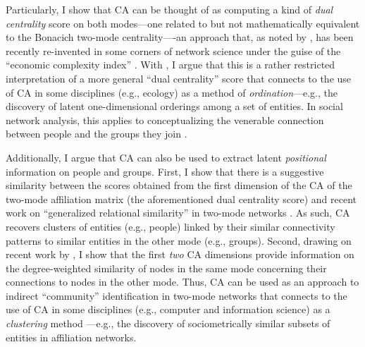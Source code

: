 \documentclass[a4paper,fleqn]{cas-sc}
\begin{document}
Particularly, I show that CA can be thought of as computing a kind of \textit{dual centrality} score on both modes---one related to but not mathematically equivalent to the Bonacich \citeyearpar{bonacich1991simultaneous} two-mode centrality----an approach that, as noted by \citet{van2021correspondence}, has been recently re-invented in some corners of network science under the guise of the ``economic complexity index'' \citep{hidalgo2009building, mealy2019interpreting}. With \citet{van2021correspondence}, I argue that this is a rather restricted interpretation of a more general ``dual centrality'' score that connects to the use of CA in some disciplines (e.g., ecology) as a method of \textit{ordination}---e.g., the discovery of latent one-dimensional orderings among a set of entities. In social network analysis, this applies to conceptualizing the venerable connection between people and the groups they join \citep{breiger1974duality}.

Additionally, I argue that CA can also be used to extract latent \textit{positional} information on people and groups. First, I show that there is a suggestive similarity between the scores obtained from the first dimension of the CA of the two-mode affiliation matrix (the aforementioned dual centrality score) and recent work on ``generalized relational similarity'' in two-mode networks \citep{kovacs2010generalized, lizardo2024two}. As such, CA recovers clusters of entities (e.g., people) linked by their similar connectivity patterns to similar entities in the other mode (e.g., groups). Second, drawing on recent work by \citet{van2021correspondence}, I show that the first \textit{two} CA dimensions provide information on the degree-weighted similarity of nodes in the same mode concerning their connections to nodes in the other mode. Thus, CA can be used as an approach to indirect ``community'' identification in two-mode networks that connects to the use of CA in some disciplines (e.g., computer and information science) as a \textit{clustering} method \citep{zha2001bipartite}---e.g., the discovery of sociometrically similar subsets of entities in affiliation networks. 
\end{document}
